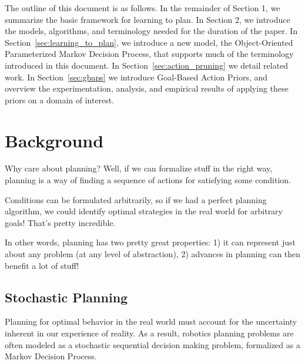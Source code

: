 \documentclass[11pt]{article}
\begin{document}

The outline of this document is as follows. In the remainder of Section 1, we summarize the basic framework for learning to plan. In Section 2, we introduce the models, algorithms, and terminology needed for the duration of the paper. In Section~\ref{sec:learning_to_plan}, we introduce a new model, the Object-Oriented Parameterized Markov Decision Process, that supports much of the terminology introduced in this document. In Section~\ref{sec:action_pruning} we detail related work. In Section~\ref{sec:gbaps} we introduce Goal-Based Action Priors, and overview the experimentation, analysis, and empirical results of applying these priors on a domain of interest.


\section{Background}
\label{sec:background}

Why care about planning? Well, if we can formalize stuff in the right way, planning is a way of finding a sequence of actions for satisfying some condition.

Conditions can be formulated arbitrarily, so if we had a perfect planning algorithm, we could identify optimal strategies in the real world for arbitrary goals! That's pretty incredible.

In other words, planning has two pretty great properties: 1) it can represent just about any problem (at any level of abstraction), 2) advances in planning can then benefit a lot of stuff!



\subsection{Stochastic Planning}

Planning for optimal behavior in the real world must account for the uncertainty inherent in our experience of reality. As a result, robotics planning problems are often modeled as a stochastic sequential decision making problem, formalized as a Markov Decision Process.

\end{document}
